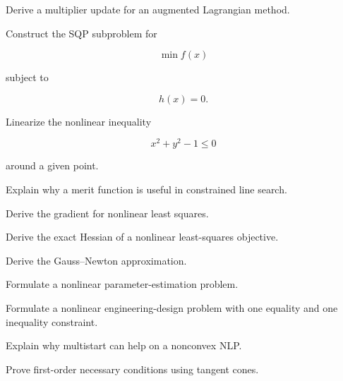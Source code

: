 \begin{exercise}[3]
Derive a multiplier update for an augmented Lagrangian method.
\end{exercise}

\begin{exercise}[3]
Construct the SQP subproblem for

\[
\min f(x)
\]

subject to

\[
h(x)=0.
\]
\end{exercise}

\begin{exercise}[3]
Linearize the nonlinear inequality

\[
x^2+y^2-1\leq0
\]

around a given point.
\end{exercise}

\begin{exercise}[3]
Explain why a merit function is useful in constrained line search.
\end{exercise}

\begin{exercise}[3]
Derive the gradient for nonlinear least squares.
\end{exercise}

\begin{exercise}[3]
Derive the exact Hessian of a nonlinear least-squares objective.
\end{exercise}

\begin{exercise}[3]
Derive the Gauss--Newton approximation.
\end{exercise}

\begin{exercise}[3]
Formulate a nonlinear parameter-estimation problem.
\end{exercise}

\begin{exercise}[3]
Formulate a nonlinear engineering-design problem with one equality and
one inequality constraint.
\end{exercise}

\begin{exercise}[3]
Explain why multistart can help on a nonconvex NLP.
\end{exercise}

\begin{exercise}[4]
Prove first-order necessary conditions using tangent cones.
\end{exercise}

